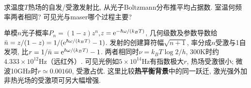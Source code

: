 \begin{exercise}
求温度$T$热场的自发/受激发射比, 从光子Boltzmann分布推平均占据数. 室温何频率两者相同? 可见光与maser哪个过程主要?
\end{exercise}
\begin{solution}
单模$n$光子概率$P_n=(1-z)z^n$,$z=\mathrm e^{-\hbar\omega/(k_BT)}$, 几何级数及参数导数给$\bar n=z/(1-z)=1/(\mathrm e^{\hbar\omega/(k_BT)}-1)$. 发射的创建算符幅$\sqrt{n+1}$, 率分成$n$受激与1自发项, 比$r=1/\bar n=\mathrm e^{\hbar\omega/(k_BT)}-1$. 两者相同时$\nu=k_BT\log2/h$, 300K时约$4.333\times10^{12}$Hz（远红外）. 可见光例如$5\times10^{14}$Hz有指数极大$r$, 热场受激很小; 微波10GHz时$r\simeq0.00160$, 受激占优. 这里比较\textbf{热平衡背景}中的同一跃迁, 激光强外加非热光场的受激项可另大幅增强.
\end{solution}
